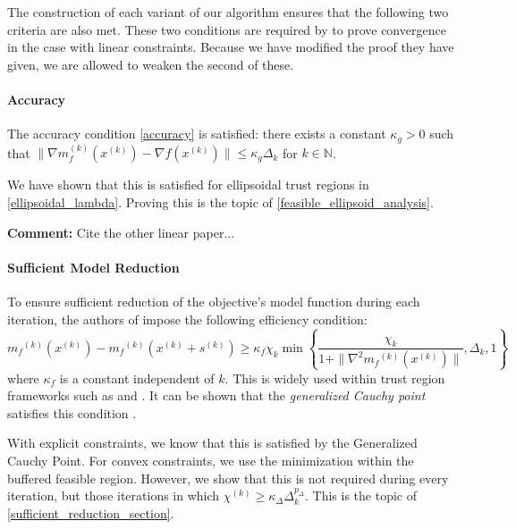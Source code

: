 \documentclass{article}
\newenvironment{comment}
  {\par\medskip
   \color{red}%
   \begin{framed}
   \textbf{Comment: }\ignorespaces}
 {\end{framed}
  \medskip}
\theoremstyle{case}
\newcommand{\xk}{{x^{(k)}}}
\newcommand{\dk}{\Delta_k}
\newcommand{\mfk}{{{m}_f}^{(k)}}
\newcommand{\sk}{{{s}^{(k)}}}
\newcommand{\chik}{{\chi^{(k)}}}
\newcommand{\ints}{\mathbb N} %
\newcommand{\gk}{{\nabla m_f^{(k)}(x^{(k)})}}
\newcommand{\grad}{\nabla f}
\begin{document}
The construction of each variant of our algorithm ensures that the following two criteria are also met.
These two conditions are required by \cite{Conejo:2013:GCT:2620806.2621814} to prove convergence in the case with linear constraints.
Because we have modified the proof they have given, we are allowed to weaken the second of these.

\paragraph{Accuracy}
The accuracy condition \cref{accuracy} is satisfied:
there exists a constant $\kappa_{g} > 0$ such that $ \| \gk - \grad(\xk) \| \le \kappa_{g} \dk $ for $k \in \ints $.

We have shown that this is satisfied for ellipsoidal trust regions in \cref{ellipsoidal_lambda}.
Proving this is the topic of \cref{feasible_ellipsoid_analysis}.


\begin{comment}
Cite the other linear paper...
\end{comment}


\paragraph{Sufficient Model Reduction}

To ensure sufficient reduction of the objective's model function during each iteration, the authors of \cite{Conejo:2013:GCT:2620806.2621814} impose the following efficiency condition:
\begin{equation}
\label{efficiency}
\mfk(\xk) - \mfk(\xk + \sk) \ge \kappa_f \chi_k \min\left\{ \frac{\chi_k}{1+\|\nabla^2 \mfk(\xk)\|}, \dk, 1 \right\}
\end{equation}
where $\kappa_f$ is a constant independent of $k$.
This is widely used within trust region frameworks such as \cite{Conejo:2013:GCT:2620806.2621814} and \cite{Conn:2000:TM:357813}.
It can be shown that the \emph{generalized Cauchy point} satisfies this condition \cite{Conn:2000:TM:357813}.



With explicit constraints, we know that this is satisfied by the Generalized Cauchy Point.
For convex constraints, we use the minimization within the buffered feasible region.
However, we show that this is not required during every iteration, but those iterations in which $\chik \ge \kappa_{\Delta}\dk^{p_{\Delta}}$.
This is the topic of \cref{sufficient_reduction_section}.
\end{document}
